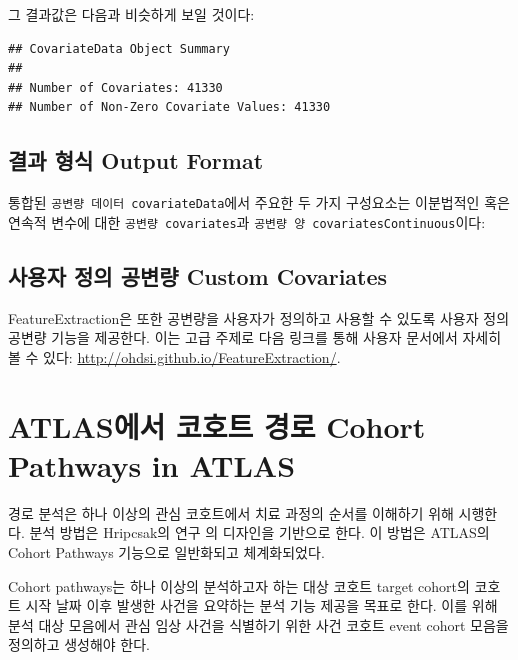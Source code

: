 \documentclass[10.5pt]{book}
\newenvironment{Shaded}{\begin{snugshade}}{\end{snugshade}}
\newcommand{\OperatorTok}[1]{\textcolor[rgb]{0.81,0.36,0.00}{\textbf{#1}}}
\newcommand{\NormalTok}[1]{#1}
\theoremstyle{definition}
\theoremstyle{definition}
\theoremstyle{definition}
\theoremstyle{remark}
\begin{document}
그 결과값은 다음과 비슷하게 보일 것이다:

\begin{verbatim}
## CovariateData Object Summary 
## 
## Number of Covariates: 41330 
## Number of Non-Zero Covariate Values: 41330
\end{verbatim}

\subsection{결과 형식 Output Format}\label{--output-format}

통합된 \texttt{공변량\ 데이터\ covariateData}에서 주요한 두 가지
구성요소는 이분법적인 혹은 연속적 변수에 대한
\texttt{공변량\ covariates}과
\texttt{공변량\ 양\ covariatesContinuous}이다:

\begin{Shaded}
\end{Shaded}

\subsection{사용자 정의 공변량 Custom
Covariates}\label{---custom-covariates}

FeatureExtraction은 또한 공변량을 사용자가 정의하고 사용할 수 있도록
사용자 정의 공변량 기능을 제공한다. 이는 고급 주제로 다음 링크를 통해
사용자 문서에서 자세히 볼 수 있다:
\url{http://ohdsi.github.io/FeatureExtraction/}.

\section{ATLAS에서 코호트 경로 Cohort Pathways in
ATLAS}\label{atlas---cohort-pathways-in-atlas}

경로 분석은 하나 이상의 관심 코호트에서 치료 과정의 순서를 이해하기 위해
시행한다. 분석 방법은 Hripcsak의 연구 \citep{Hripcsak7329} 의 디자인을
기반으로 한다. 이 방법은 ATLAS의 Cohort Pathways 기능으로 일반화되고
체계화되었다.

Cohort pathways는 하나 이상의 분석하고자 하는 대상 코호트 target
cohort의 코호트 시작 날짜 이후 발생한 사건을 요약하는 분석 기능 제공을
목표로 한다. 이를 위해 분석 대상 모음에서 관심 임상 사건을 식별하기 위한
사건 코호트 event cohort 모음을 정의하고 생성해야 한다.
\end{document}
